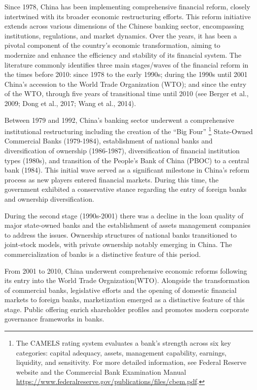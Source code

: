 \documentclass[
  12pt,
  a4paper,
]{scrreprt}
\begin{document}
{{{{Since 1978, China has been implementing comprehensive financial reform,
closely intertwined with its broader economic restructuring efforts.
This reform initiative extends across various dimensions of the Chinese
banking sector, encompassing institutions, regulations, and market
dynamics. Over the years, it has been a pivotal component of the
country's economic transformation, aiming to modernize and enhance the
efficiency and stability of its financial system. The literature
commonly identifies three main stages/waves of the financial reform in
the times before 2010: since 1978 to the early 1990s; during the 1990s
until 2001 China's accession to the World Trade Organization (WTO); and
since the entry of the WTO, through five years of transitional time
until 2010 (see Berger et al., 2009; Dong et al., 2017; Wang et al.,
2014).

Between 1979 and 1992, China's banking sector underwent a comprehensive
institutional restructuring including the creation of the ``Big Four''
\footnote{The CAMELS rating system evaluates a bank's strength across
  six key categories: capital adequacy, assets, management capability,
  earnings, liquidity, and sensitivity. For more detailed information,
  see Federal Reserve website and the Commercial Bank Examination Manual
  \url{https://www.federalreserve.gov/publications/files/cbem.pdf}.}
State-Owned Commercial Banks (1979-1984), establishment of national
banks and diversification of ownership (1986-1987), diversification of
financial institution types (1980s), and transition of the People's Bank
of China (PBOC) to a central bank (1984). This initial wave served as a
significant milestone in China's reform process as new players entered
financial markets. During this time, the government exhibited a
conservative stance regarding the entry of foreign banks and ownership
diversification.

During the second stage (1990s-2001) there was a decline in the loan
quality of major state-owned banks and the establishment of assets
management companies to address the issues. Ownership structures of
national banks transitioned to joint-stock models, with private
ownership notably emerging in China. The commercialization of banks is a
distinctive feature of this period.

From 2001 to 2010, China underwent comprehensive economic reforms
following its entry into the World Trade Orgnization(WTO). Alongside the
transformation of commercial banks, legislative efforts and the opening
of domestic financial markets to foreign banks, marketization emerged as
a distinctive feature of this stage. Public offering enrich shareholder
profiles and promotes modern corporate governance frameworks in banks.

}}}}
\end{document}
